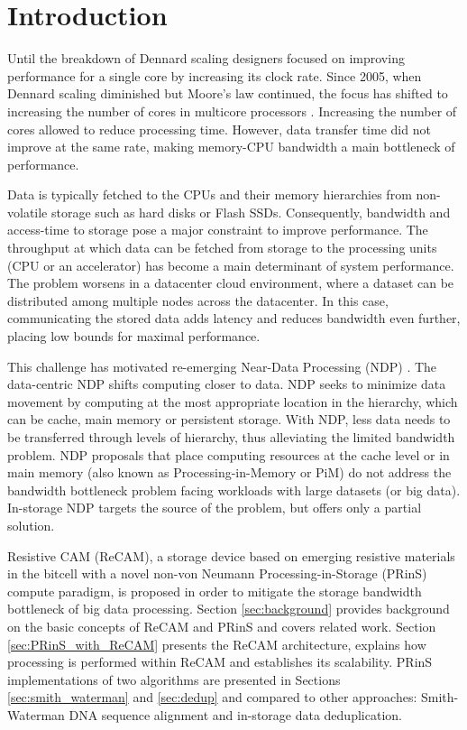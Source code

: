 \documentclass{superfri}
\begin{document}
\section{Introduction}
\label{sec:motivation}
Until the breakdown of Dennard scaling designers focused on improving performance for a single core by increasing its clock rate. Since 2005, when Dennard scaling diminished but Moore's law continued, the focus has shifted to increasing the number of cores in multicore processors \cite{esmaeilzadeh2011dark}. Increasing the number of cores allowed to reduce processing time. However, data transfer time did not improve at the same rate, making memory-CPU bandwidth a main bottleneck of performance.

Data is typically fetched to the CPUs and their memory hierarchies from non-volatile storage such as hard disks or Flash SSDs. Consequently, bandwidth and access-time to storage pose a major constraint to improve performance. The throughput at which data can be fetched from storage to the processing units (CPU or an accelerator) has become a main determinant of system performance. The problem worsens in a datacenter cloud environment, where a dataset can be distributed among multiple nodes across the datacenter. In this case, communicating the stored data adds latency and reduces bandwidth even further, placing low bounds for maximal performance.

This challenge has motivated re-emerging Near-Data Processing (NDP) \cite{balasubramonian2014near}. The data-centric NDP shifts computing closer to data. NDP seeks to minimize data movement by computing at the most appropriate location in the hierarchy, which can be cache, main memory or persistent storage. With NDP, less data needs to be transferred through levels of hierarchy, thus alleviating the limited bandwidth problem. NDP proposals that place computing resources at the cache level \cite{yavits2015computer} or in main memory \cite{guo2011resistive}\cite{ahn2015scalable}\cite{de2016cudalign} (also known as Processing-in-Memory or PiM) do not address the bandwidth bottleneck problem facing workloads with large datasets (or big data). In-storage NDP targets the source of the problem, but offers only a partial solution.

Resistive CAM (ReCAM), a storage device based on emerging resistive materials in the bitcell with a novel non-von Neumann Processing-in-Storage (PRinS) compute paradigm, is proposed in order to mitigate the storage bandwidth bottleneck of big data processing. Section \ref{sec:background} provides background on the basic concepts of ReCAM and PRinS and covers related work. Section \ref{sec:PRinS_with_ReCAM} presents the ReCAM architecture, explains how processing is performed within ReCAM and establishes its scalability. PRinS implementations of two algorithms are presented in Sections \ref{sec:smith_waterman} and \ref{sec:dedup} and compared to other approaches: Smith-Waterman DNA sequence alignment and in-storage data deduplication.
\end{document}
